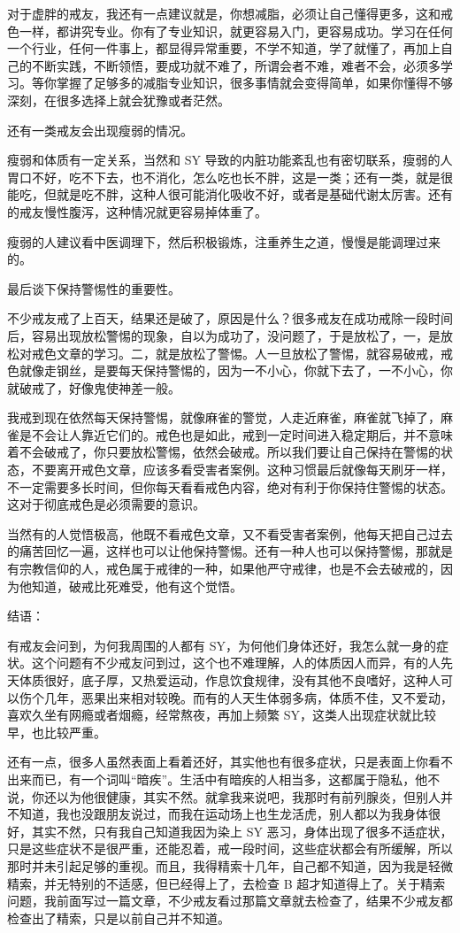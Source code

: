 \documentclass{ctexart}
\begin{document}
对于虚胖的戒友，我还有一点建议就是，你想减脂，必须让自己懂得更多，这和戒色一样，都讲究专业。你有了专业知识，就更容易入门，更容易成功。学习在任何一个行业，任何一件事上，都显得异常重要，不学不知道，学了就懂了，再加上自己的不断实践，不断领悟，要成功就不难了，所谓会者不难，难者不会，必须多学习。等你掌握了足够多的减脂专业知识，很多事情就会变得简单，如果你懂得不够深刻，在很多选择上就会犹豫或者茫然。

还有一类戒友会出现瘦弱的情况。

瘦弱和体质有一定关系，当然和 SY 导致的内脏功能紊乱也有密切联系，瘦弱的人胃口不好，吃不下去，也不消化，怎么吃也长不胖，这是一类；还有一类，就是很能吃，但就是吃不胖，这种人很可能消化吸收不好，或者是基础代谢太厉害。还有的戒友慢性腹泻，这种情况就更容易掉体重了。

瘦弱的人建议看中医调理下，然后积极锻炼，注重养生之道，慢慢是能调理过来的。

最后谈下保持警惕性的重要性。

不少戒友戒了上百天，结果还是破了，原因是什么？很多戒友在成功戒除一段时间后，容易出现放松警惕的现象，自以为成功了，没问题了，于是放松了，一，是放松对戒色文章的学习。二，就是放松了警惕。人一旦放松了警惕，就容易破戒，戒色就像走钢丝，是要每天保持警惕的，因为一不小心，你就下去了，一不小心，你就破戒了，好像鬼使神差一般。

我戒到现在依然每天保持警惕，就像麻雀的警觉，人走近麻雀，麻雀就飞掉了，麻雀是不会让人靠近它们的。戒色也是如此，戒到一定时间进入稳定期后，并不意味着不会破戒了，你只要放松警惕，依然会破戒。所以我们要让自己保持在警惕的状态，不要离开戒色文章，应该多看受害者案例。这种习惯最后就像每天刷牙一样，不一定需要多长时间，但你每天看看戒色内容，绝对有利于你保持住警惕的状态。这对于彻底戒色是必须需要的意识。

当然有的人觉悟极高，他既不看戒色文章，又不看受害者案例，他每天把自己过去的痛苦回忆一遍，这样也可以让他保持警惕。还有一种人也可以保持警惕，那就是有宗教信仰的人，戒色属于戒律的一种，如果他严守戒律，也是不会去破戒的，因为他知道，破戒比死难受，他有这个觉悟。

结语：

有戒友会问到，为何我周围的人都有 SY，为何他们身体还好，我怎么就一身的症状。这个问题有不少戒友问到过，这个也不难理解，人的体质因人而异，有的人先天体质很好，底子厚，又热爱运动，作息饮食规律，没有其他不良嗜好，这种人可以伤个几年，恶果出来相对较晚。而有的人天生体弱多病，体质不佳，又不爱动，喜欢久坐有网瘾或者烟瘾，经常熬夜，再加上频繁 SY，这类人出现症状就比较早，也比较严重。

还有一点，很多人虽然表面上看着还好，其实他也有很多症状，只是表面上你看不出来而已，有一个词叫“暗疾”。生活中有暗疾的人相当多，这都属于隐私，他不说，你还以为他很健康，其实不然。就拿我来说吧，我那时有前列腺炎，但别人并不知道，我也没跟朋友说过，而我在运动场上也生龙活虎，别人都以为我身体很好，其实不然，只有我自己知道我因为染上 SY 恶习，身体出现了很多不适症状，只是这些症状不是很严重，还能忍着，戒一段时间，这些症状都会有所缓解，所以那时并未引起足够的重视。而且，我得精索十几年，自己都不知道，因为我是轻微精索，并无特别的不适感，但已经得上了，去检查 B 超才知道得上了。关于精索问题，我前面写过一篇文章，不少戒友看过那篇文章就去检查了，结果不少戒友都检查出了精索，只是以前自己并不知道。
\end{document}
